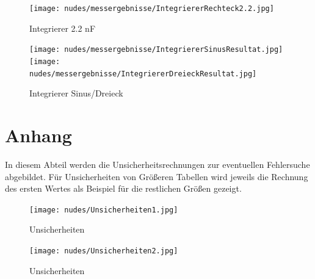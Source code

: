 \documentclass[12pt,a4paper,twoside]{article}
\begin{document}
\begin{figure}[H]
    \centering
    \texttt{[image: nudes/messergebnisse/IntegriererRechteck2.2.jpg]}
    \caption{Integrierer 2.2 nF}
    \label{fig:IntegriererResultat2AW}
\end{figure}

\begin{figure}[H]
    \centering
    \texttt{[image: nudes/messergebnisse/IntegriererSinusResultat.jpg]}
    \texttt{[image: nudes/messergebnisse/IntegriererDreieckResultat.jpg]}
    \caption{Integrierer Sinus/Dreieck}
    \label{fig:IntegriererResultat3AW}
\end{figure}

\newpage
\section{Anhang}

In diesem Abteil werden die Unsicherheitsrechnungen zur eventuellen Fehlersuche abgebildet. Für Unsicherheiten von Größeren Tabellen wird jeweils die Rechnung des ersten Wertes als Beispiel für die restlichen Größen gezeigt.

\begin{figure}[H]
    \centering
    \texttt{[image: nudes/Unsicherheiten1.jpg]}
    \caption{Unsicherheiten}
    \label{fig:Unsicherheiten1}
\end{figure}

\begin{figure}[H]
    \centering
    \texttt{[image: nudes/Unsicherheiten2.jpg]}
    \caption{Unsicherheiten}
    \label{fig:Unsicherheiten2}
\end{figure}

\printbibliography[heading=bibintoc]
\end{document}
